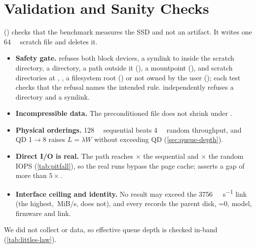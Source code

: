 \section{Validation and Sanity Checks}\label{sec:validation}

 () checks that the benchmark
measures the SSD and not an artifact. It writes one \qty{64}{\mebi\byte} scratch file and deletes it.
\begin{itemize}
  \item \textbf{Safety gate.}  refuses both block devices, a symlink to 
        inside the scratch directory, a directory, a path outside it (), a mountpoint
        (\code{/}), and scratch directories at \code{/}, , a filesystem root
        () or not owned by the user (); each test checks that the refusal
        names the intended rule.  independently refuses a directory and a symlink.
  \item \textbf{Incompressible data.} The preconditioned file does not shrink under .
  \item \textbf{Physical orderings.} \qty{128}{\kibi\byte} sequential beats \qty{4}{\kibi\byte} random
        throughput, and QD 1$\to$8 raises $L=\lambda W$ without exceeding QD (\cref{sec:queue-depth}).
  \item \textbf{Direct I/O is real.} \csvget{}%
        \csvget{}\csvget{}%
        The  path reaches \ssdratio[0]{\ssdVb}{\ssdVd}$\times$ the sequential and
        \ssdratio[0]{\ssdVb}{\ssdVr}$\times$ the random  IOPS (\cref{tab:pitfall}), so the real
        runs bypass the page cache;  asserts a gap of more than $5\times$.
  \item \textbf{Interface ceiling and identity.} No result may exceed the
        \qty{3756}{\mebi\byte\per\second} link (the highest,
        \,MiB/s, does not), and every
         records the parent disk, =0, model, firmware and link.
\end{itemize}
We did not collect  or  data, so effective queue depth is checked in-band
(\cref{tab:littles-law}).

